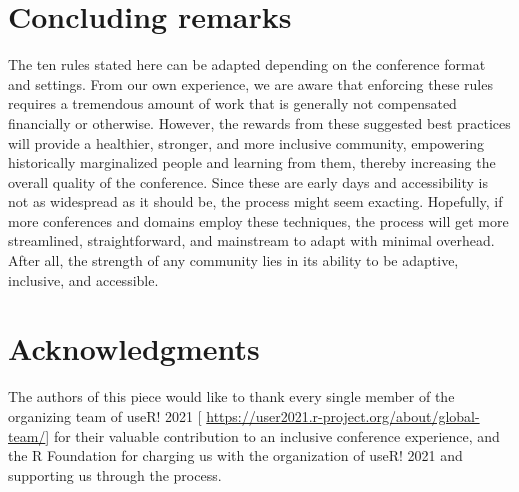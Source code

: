 \documentclass[10pt,letterpaper]{article}
\begin{document}
\section*{Concluding remarks}

The ten rules stated here can be adapted depending on the conference format and settings. From our own experience, we are aware that enforcing these rules requires a tremendous amount of work that is generally not compensated financially or otherwise. However, the rewards from these suggested best practices will provide a healthier, stronger, and more inclusive community, empowering historically marginalized people and learning from them, thereby increasing the overall quality of the conference. Since these are early days and accessibility is not as widespread as it should be, the process might seem exacting. Hopefully, if more conferences and domains employ these techniques, the process will get more streamlined, straightforward, and mainstream to adapt with minimal overhead. After all, the strength of any community lies in its ability to be adaptive, inclusive, and accessible.


\section*{Acknowledgments}
The authors of this piece would like to thank every single member of the organizing team of useR! 2021 [ \url{https://user2021.r-project.org/about/global-team/}] for their valuable contribution to an inclusive conference experience, and the R Foundation for charging us with the organization of useR! 2021 and supporting us through the process. 




\end{document}
